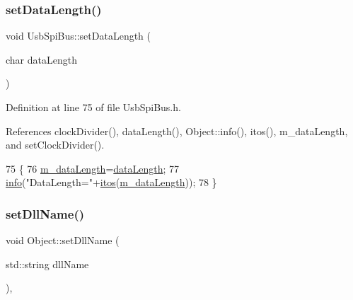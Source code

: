 \mbox{\label{classUsbSpiBus_abb9644f0110078dc08c84c907d11272e}} 
\subsubsection{\texorpdfstring{set\+Data\+Length()}{setDataLength()}}
{\footnotesize\ttfamily void Usb\+Spi\+Bus\+::set\+Data\+Length (\begin{DoxyParamCaption}\item[{char}]{data\+Length }\end{DoxyParamCaption})\hspace{0.3cm}{\ttfamily [inline]}}



Definition at line 75 of file Usb\+Spi\+Bus.\+h.



References clock\+Divider(), data\+Length(), Object\+::info(), itos(), m\+\_\+data\+Length, and set\+Clock\+Divider().


\begin{DoxyCode}
75                                      \{
76       \hyperlink{classUsbSpiBus_a2d8b2bddd6d4d5dc53c38b5698737c5c}{m\_dataLength}=\hyperlink{classUsbSpiBus_ae7d38b275b5267f795b2d9f1d561d688}{dataLength};
77       \hyperlink{classObject_a644fd329ea4cb85f54fa6846484b84a8}{info}(\textcolor{stringliteral}{"DataLength="}+\hyperlink{Tools_8h_af330027dbdafb9a30768b3613c553e60}{itos}(\hyperlink{classUsbSpiBus_a2d8b2bddd6d4d5dc53c38b5698737c5c}{m\_dataLength}));
78   \}
\end{DoxyCode}
\mbox{\label{classObject_a870c5af919958c2136623b2d7816d123}} 
\subsubsection{\texorpdfstring{set\+Dll\+Name()}{setDllName()}}
{\footnotesize\ttfamily void Object\+::set\+Dll\+Name (\begin{DoxyParamCaption}\item[{std\+::string}]{dll\+Name }\end{DoxyParamCaption})\hspace{0.3cm}{\ttfamily [inline]}, {\ttfamily [inherited]}}

